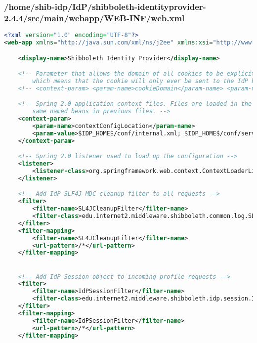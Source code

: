 \subsubsection{/home/shib-idp/IdP/shibboleth-identityprovider-2.4.4/src/main/webapp/WEB-INF/web.xml}
\begin{lstlisting}[language=xml]
<?xml version="1.0" encoding="UTF-8"?>
<web-app xmlns="http://java.sun.com/xml/ns/j2ee" xmlns:xsi="http://www.w3.org/2001/XMLSchema-instance" xsi:schemaLocation="http://java.sun.com/xml/ns/j2ee http://java.sun.com/xml/ns/j2ee/web-app_2_4.xsd" version="2.4">

    <display-name>Shibboleth Identity Provider</display-name>

    <!-- Parameter that allows the domain of all cookies to be explicitly set. If not set the domain is left empty
        which means that the cookie will only ever be sent to the IdP host. -->
    <!-- <context-param> <param-name>cookieDomain</param-name> <param-value>example.org</param-value> </context-param> -->

    <!-- Spring 2.0 application context files. Files are loaded in the order they appear with subsequent files overwriting 
        same named beans in previous files. -->
    <context-param>
        <param-name>contextConfigLocation</param-name>
        <param-value>$IDP_HOME$/conf/internal.xml; $IDP_HOME$/conf/service.xml; $IDP_HOME$/conf/uApprove.xml;</param-value>
    </context-param>

    <!-- Spring 2.0 listener used to load up the configuration -->
    <listener>
        <listener-class>org.springframework.web.context.ContextLoaderListener</listener-class>
    </listener>

    <!-- Add IdP SLF4J MDC cleanup filter to all requests -->
    <filter>
        <filter-name>SL4JCleanupFilter</filter-name>
        <filter-class>edu.internet2.middleware.shibboleth.common.log.SLF4JMDCCleanupFilter</filter-class>
    </filter>
    <filter-mapping>
        <filter-name>SL4JCleanupFilter</filter-name>
        <url-pattern>/*</url-pattern>
    </filter-mapping>


    <!-- Add IdP Session object to incoming profile requests -->
    <filter>
        <filter-name>IdPSessionFilter</filter-name>
        <filter-class>edu.internet2.middleware.shibboleth.idp.session.IdPSessionFilter</filter-class>
    </filter>
    <filter-mapping>
        <filter-name>IdPSessionFilter</filter-name>
        <url-pattern>/*</url-pattern>
    </filter-mapping>


\end{lstlisting}
